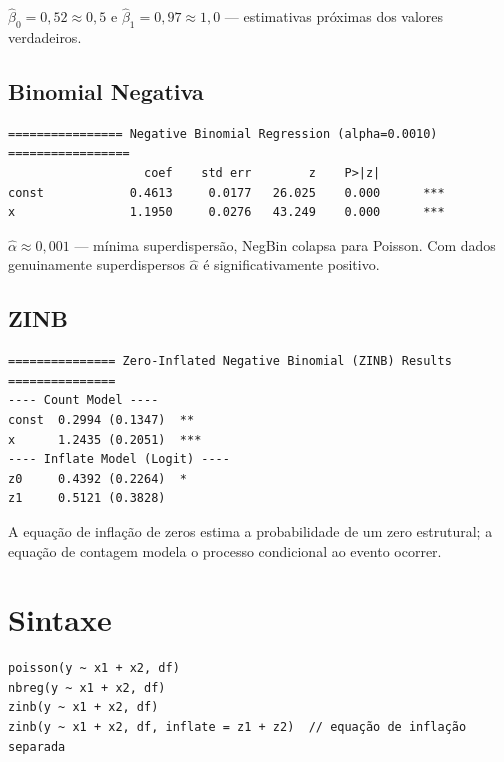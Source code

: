 $\hat\beta_0 = 0{,}52 \approx 0{,}5$ e $\hat\beta_1 = 0{,}97 \approx 1{,}0$ —
estimativas próximas dos valores verdadeiros.

\subsection*{Binomial Negativa}

\begin{lstlisting}[language={}, basicstyle=\ttfamily\small,
  frame=none, numbers=none, backgroundcolor=\color{codbg},
  xleftmargin=0pt, xrightmargin=0pt, breaklines=false]
================ Negative Binomial Regression (alpha=0.0010) =================
                   coef    std err        z    P>|z|
const            0.4613     0.0177   26.025    0.000      ***
x                1.1950     0.0276   43.249    0.000      ***
\end{lstlisting}

$\hat\alpha \approx 0{,}001$ — mínima superdispersão, NegBin colapsa para Poisson. Com dados genuinamente superdispersos $\hat\alpha$ é significativamente positivo.

\subsection*{ZINB}

\begin{lstlisting}[language={}, basicstyle=\ttfamily\small,
  frame=none, numbers=none, backgroundcolor=\color{codbg},
  xleftmargin=0pt, xrightmargin=0pt, breaklines=false]
=============== Zero-Inflated Negative Binomial (ZINB) Results ===============
---- Count Model ----
const  0.2994 (0.1347)  **
x      1.2435 (0.2051)  ***
---- Inflate Model (Logit) ----
z0     0.4392 (0.2264)  *
z1     0.5121 (0.3828)
\end{lstlisting}

A equação de inflação de zeros estima a probabilidade de um zero estrutural;
a equação de contagem modela o processo condicional ao evento ocorrer.

\section{Sintaxe}

\begin{lstlisting}
poisson(y ~ x1 + x2, df)
nbreg(y ~ x1 + x2, df)
zinb(y ~ x1 + x2, df)
zinb(y ~ x1 + x2, df, inflate = z1 + z2)  // equação de inflação separada
\end{lstlisting}

